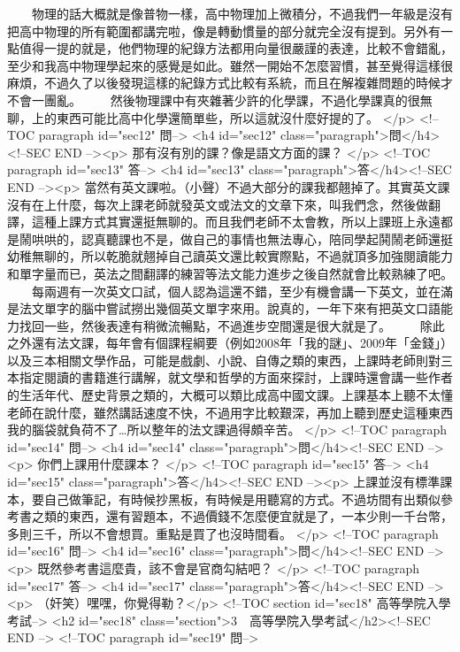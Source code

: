 {{{{　　物理的話大概就是像普物一樣，高中物理加上微積分，不過我們一年級是沒有把高中物理的所有範圍都講完啦，像是轉動慣量的部分就完全沒有提到。另外有一點值得一提的就是，他們物理的紀錄方法都用向量很嚴謹的表達，比較不會錯亂，至少和我高中物理學起來的感覺是如此。雖然一開始不怎麼習慣，甚至覺得這樣很麻煩，不過久了以後發現這樣的紀錄方式比較有系統，而且在解複雜問題的時候才不會一團亂。
　　然後物理課中有夾雜著少許的化學課，不過化學課真的很無聊，上的東西可能比高中化學還簡單些，所以這就沒什麼好提的了。
</p>
<!--TOC paragraph id="sec12" 問-->
<h4 id="sec12" class="paragraph">問</h4><!--SEC END --><p>
那有沒有別的課？像是語文方面的課？
</p>
<!--TOC paragraph id="sec13" 答-->
<h4 id="sec13" class="paragraph">答</h4><!--SEC END --><p>
當然有英文課啦。（小聲）不過大部分的課我都翹掉了。其實英文課沒有在上什麼，每次上課老師就發英文或法文的文章下來，叫我們念，然後做翻譯，這種上課方式其實還挺無聊的。而且我們老師不太會教，所以上課班上永遠都是鬧哄哄的，認真聽課也不是，做自己的事情也無法專心，陪同學起鬨鬧老師還挺幼稚無聊的，所以乾脆就翹掉自己讀英文還比較實際點，不過就頂多加強閱讀能力和單字量而已，英法之間翻譯的練習等法文能力進步之後自然就會比較熟練了吧。
　　每兩週有一次英文口試，個人認為這還不錯，至少有機會講一下英文，並在滿是法文單字的腦中嘗試撈出幾個英文單字來用。說真的，一年下來有把英文口語能力找回一些，然後表達有稍微流暢點，不過進步空間還是很大就是了。
　　除此之外還有法文課，每年會有個課程綱要（例如2008年「我的謎」、2009年「金錢」）以及三本相關文學作品，可能是戲劇、小說、自傳之類的東西，上課時老師則對三本指定閱讀的書籍進行講解，就文學和哲學的方面來探討，上課時還會講一些作者的生活年代、歷史背景之類的，大概可以類比成高中國文課。上課基本上聽不太懂老師在說什麼，雖然講話速度不快，不過用字比較艱深，再加上聽到歷史這種東西我的腦袋就負荷不了…所以整年的法文課過得頗辛苦。
</p>
<!--TOC paragraph id="sec14" 問-->
<h4 id="sec14" class="paragraph">問</h4><!--SEC END --><p>
你們上課用什麼課本？
</p>
<!--TOC paragraph id="sec15" 答-->
<h4 id="sec15" class="paragraph">答</h4><!--SEC END --><p>
上課並沒有標準課本，要自己做筆記，有時候抄黑板，有時候是用聽寫的方式。不過坊間有出類似參考書之類的東西，還有習題本，不過價錢不怎麼便宜就是了，一本少則一千台幣，多則三千，所以不會想買。重點是買了也沒時間看。
</p>
<!--TOC paragraph id="sec16" 問-->
<h4 id="sec16" class="paragraph">問</h4><!--SEC END --><p>
既然參考書這麼貴，該不會是官商勾結吧？
</p>
<!--TOC paragraph id="sec17" 答-->
<h4 id="sec17" class="paragraph">答</h4><!--SEC END --><p>
（奸笑）嘿嘿，你覺得勒？</p>
<!--TOC section id="sec18" 高等學院入學考試-->
<h2 id="sec18" class="section">3  高等學院入學考試</h2><!--SEC END -->
<!--TOC paragraph id="sec19" 問-->
}}}}
